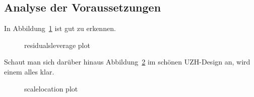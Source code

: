 \documentclass[
  a4paper,
  DIV=11,
  numbers=noendperiod]{scrartcl}
\begin{document}
\subsection{Analyse der
Voraussetzungen}\label{analyse-der-voraussetzungen}

In Abbildung~\ref{fig-reslev} ist gut zu erkennen.

\begin{figure}


\caption{\label{fig-reslev}residualsleverage plot}

\end{figure}%

Schaut man sich darüber hinaus Abbildung~\ref{fig-scaleloc} im schönen
UZH-Design an, wird einem alles klar.

\begin{figure}


\caption{\label{fig-scaleloc}scalelocation plot}

\end{figure}%
\end{document}
